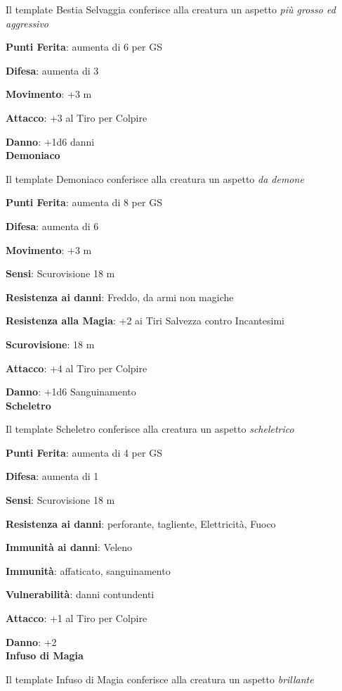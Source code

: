 \begin{multicols}{2}
Il template Bestia Selvaggia conferisce alla creatura un aspetto \emph{più grosso ed aggressivo}

\textbf{Punti Ferita}: aumenta di 6 per GS

\textbf{Difesa}: aumenta di 3

\textbf{Movimento}: +3 m

\textbf{Attacco}: +3 al Tiro per Colpire

\textbf{Danno}: +1d6 danni\\

\textbf{Demoniaco}

Il template Demoniaco conferisce alla creatura un aspetto \emph{da demone}

\textbf{Punti Ferita}: aumenta di 8 per GS

\textbf{Difesa}: aumenta di 6

\textbf{Movimento}: +3 m

\textbf{Sensi}: Scurovisione 18 m

\textbf{Resistenza ai danni}: Freddo, da armi non magiche

\textbf{Resistenza alla Magia}: +2 ai Tiri Salvezza contro Incantesimi

\textbf{Scurovisione}: 18 m

\textbf{Attacco}: +4 al Tiro per Colpire

\textbf{Danno}: +1d6 Sanguinamento\\

\textbf{Scheletro}

Il template Scheletro conferisce alla creatura un aspetto \emph{scheletrico}

\textbf{Punti Ferita}: aumenta di 4 per GS

\textbf{Difesa}: aumenta di 1

\textbf{Sensi}: Scurovisione 18 m

\textbf{Resistenza ai danni}:  perforante, tagliente, Elettricità, Fuoco

\textbf{Immunità ai danni}: Veleno

\textbf{Immunità}: affaticato, sanguinamento

\textbf{Vulnerabilità}: danni contundenti

\textbf{Attacco}: +1 al Tiro per Colpire

\textbf{Danno}: +2\\

\textbf{Infuso di Magia}

Il template Infuso di Magia conferisce alla creatura un aspetto \emph{brillante}


\end{multicols}
